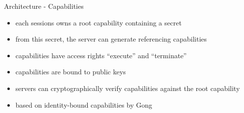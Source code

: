 \documentclass[a4paper]{beamer}
\begin{document}
\begin{frame}{Architecture - Capabilities}
    \begin{itemize}
        \item each sessions owns a root capability containing a secret
        \item from this secret, the server can generate referencing capabilities
        \item capabilities have access rights ``execute'' and ``terminate''
        \item capabilities are bound to public keys
        \item servers can cryptographically verify capabilities against the root capability
        \item based on identity-bound capabilities by Gong \cite{gong1989secure}
    \end{itemize}
\end{frame}
\end{document}
